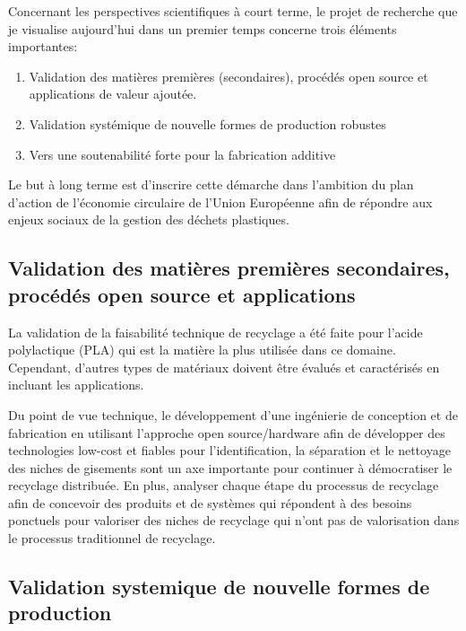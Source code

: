 \documentclass[
  12pt,
  oneside]{book}
\providecommand{\tightlist}{%
  \setlength{\itemsep}{0pt}\setlength{\parskip}{0pt}}
\begin{document}
Concernant les perspectives scientifiques à court terme, le projet de recherche que je visualise aujourd'hui dans un premier temps concerne trois éléments importantes:

\begin{enumerate}
\def\labelenumi{\arabic{enumi}.}
\tightlist
\item
  Validation des matières premières (secondaires), procédés open source et applications de valeur ajoutée.
\item
  Validation systémique de nouvelle formes de production robustes
\item
  Vers une soutenabilité forte pour la fabrication additive
\end{enumerate}

Le but à long terme est d'inscrire cette démarche dans l'ambition du plan d'action de l'économie circulaire de l'Union Européenne afin de répondre aux enjeux sociaux de la gestion des déchets plastiques.

\hypertarget{validation-des-matiuxe8res-premiuxe8res-secondaires-procuxe9duxe9s-open-source-et-applications}{%
\subsection{Validation des matières premières secondaires, procédés open source et applications}\label{validation-des-matiuxe8res-premiuxe8res-secondaires-procuxe9duxe9s-open-source-et-applications}}

La validation de la faisabilité technique de recyclage a été faite pour l'acide polylactique (PLA) qui est la matière la plus utilisée dans ce domaine. Cependant, d'autres types de matériaux doivent être évalués et caractérisés en incluant les applications.

Du point de vue technique, le développement d'une ingénierie de conception et de fabrication en utilisant l'approche open source/hardware afin de développer des technologies low-cost et fiables pour l'identification, la séparation et le nettoyage des niches de gisements sont un axe importante pour continuer à démocratiser le recyclage distribuée. En plus, analyser chaque étape du processus de recyclage afin de concevoir des produits et de systèmes qui répondent à des besoins ponctuels pour valoriser des niches de recyclage qui n'ont pas de valorisation dans le processus traditionnel de recyclage.

\hypertarget{validation-systemique-de-nouvelle-formes-de-production}{%
\subsection{Validation systemique de nouvelle formes de production}\label{validation-systemique-de-nouvelle-formes-de-production}}
\end{document}
